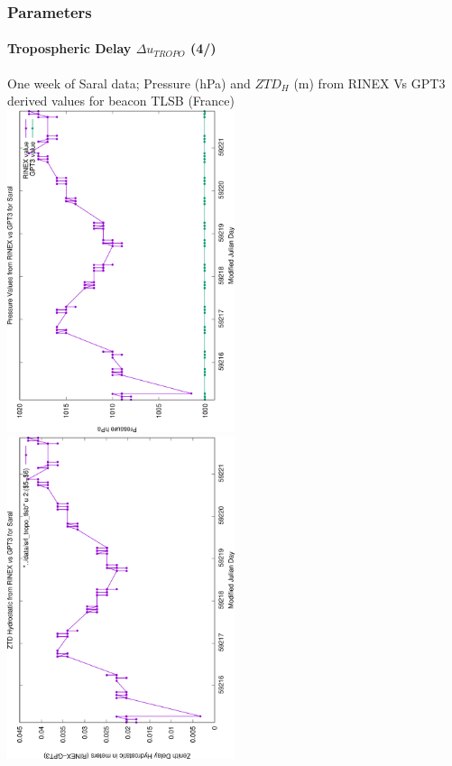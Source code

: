 \documentclass{beamer}
\begin{document}
\begin{frame}\frametitle{Parameters}\framesubtitle{Tropospheric Delay \(\Delta u_{TROPO}\) (4/)}
  One week of Saral data; Pressure (hPa) and \(ZTD_H\) (m) from RINEX Vs GPT3 derived values for beacon TLSB (France)
    \includegraphics[angle=-90, width=0.5\textwidth]{Saral-TLSB-pressure12}%
    \includegraphics[angle=-90, width=0.5\textwidth]{Saral-TLSB-ztdh}
\end{frame}
\end{document}
